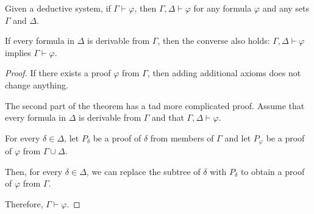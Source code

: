\begin{proposition}\label{thm:deductive_system_transitivity}
  Given a deductive system, if \( \Gamma \vdash \varphi \), then \( \Gamma, \Delta \vdash \varphi \) for any formula \( \varphi \) and any sets \( \Gamma \) and \( \Delta \).

  If every formula in \( \Delta \) is derivable from \( \Gamma \), then the converse also holds: \( \Gamma, \Delta \vdash \varphi \) implies \( \Gamma \vdash \varphi \).
\end{proposition}
\begin{proof}
  If there exists a proof \( \varphi \) from \( \Gamma \), then adding additional axioms does not change anything.

  The second part of the theorem has a tad more complicated proof. Assume that every formula in \( \Delta \) is derivable from \( \Gamma \) and that \( \Gamma, \Delta \vdash \varphi \).

  For every \( \delta \in \Delta \), let \( P_\delta \) be a proof of \( \delta \) from members of \( \Gamma \) and let \( P_\varphi \) be a proof of \( \varphi \) from \( \Gamma \cup \Delta \).

  Then, for every \( \delta \in \Delta \), we can replace the subtree of \( \delta \) with \( P_\delta \) to obtain a proof of \( \varphi \) from \( \Gamma \).

  Therefore, \( \Gamma \vdash \varphi \).
\end{proof}

